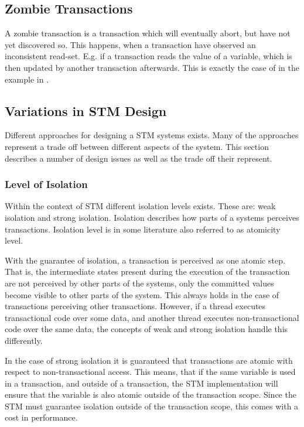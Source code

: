 \subsection{Zombie Transactions}
\label{subsec:zombie}
A zombie transaction is a transaction which will eventually abort, but have not yet discovered so. This happens, when a transaction have observed an inconsistent read-set\cite[p. 196]{dice2006transactional}. E.g. if a transaction reads the value of a variable, which is then updated by another transaction afterwards. This is exactly the case of  in the example in . 

\subsection{Variations in \ac{STM} Design}
Different approaches for designing a \ac{STM} systems exists. Many of the approaches represent a trade off between different aspects of the system.  This section describes a number of design issues as well as the trade off their represent.

\subsubsection{Level of Isolation}
\label{subsec:isolation_level}
Within the context of \ac{STM} different isolation levels exists. These are: weak isolation and strong isolation. Isolation describes how parts of a systems perceives transactions. Isolation level is in some literature also referred to as atomicity level\cite[p. 30]{harris2010transactional}.

With the guarantee of isolation, a transaction is perceived as one atomic step. That is, the intermediate states present during the execution of the transaction are not perceived by other parts of the systems, only the committed values become visible to other parts of the system. This always holds in the case of transactions perceiving other transactions. However, if a thread executes transactional code over some data, and another thread executes non-transactional code over the same data, the concepts of weak and strong isolation handle this differently.

In the case of strong isolation it is guaranteed that transactions are atomic with respect to non-transactional access\cite[p. 2083]{herlihy2011tm}. This means, that if the same variable is used in a transaction, and outside of a transaction, the \ac{STM} implementation will ensure that the variable is also atomic outside of the transaction scope. Since the \ac{STM} must guarantee isolation outside of the transaction scope, this comes with a cost in performance\cite{herlihy2011tm}. 

